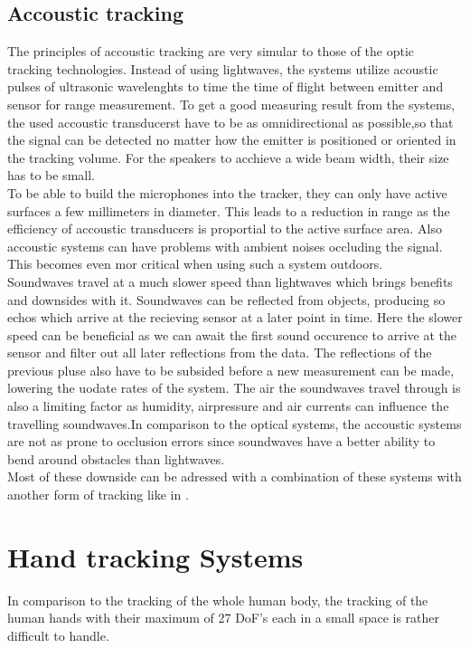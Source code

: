 \subsection{Accoustic tracking}
The principles of accoustic tracking are very simular to those of the optic tracking technologies. Instead of using lightwaves, the systems utilize acoustic pulses of ultrasonic wavelenghts to time the time of flight between emitter and sensor for range measurement. To get a good measuring result from the systems, the used accoustic transducerst have to be as omnidirectional as possible,so that the signal can be detected no matter how the emitter is positioned or oriented in the tracking volume. For the speakers to acchieve a wide beam width, their size has to be small.\\ To be able to build the microphones into the tracker, they can only have active surfaces a few millimeters in diameter. This leads to a reduction in range as the efficiency of accoustic transducers is proportial to the active surface area. Also accoustic systems can have problems with ambient noises occluding the signal. This becomes even mor critical when using such a system outdoors.\\Soundwaves travel at a much slower speed than lightwaves which brings benefits and downsides with it. Soundwaves can be reflected from objects, producing so echos which arrive at the recieving sensor at a later point in time. Here the slower speed can be beneficial as we can await the first sound occurence to arrive at the sensor and filter out all later reflections from the data. The reflections of the previous pluse also have to be subsided before a new measurement can be made, lowering the uodate rates of the system. The air the soundwaves travel through is also a limiting factor as humidity, airpressure and air currents can influence the travelling soundwaves.In comparison to the optical systems, the accoustic systems are not as prone to occlusion errors since soundwaves have a better ability to bend around obstacles  than lightwaves.
\\Most of these downside can be adressed with a combination of these systems with another form of tracking like in \cite{Foxlin.1998}.
\section{Hand tracking Systems}
In comparison to the tracking of the whole human body, the tracking of the human hands with their maximum of 27 DoF's each in a small space is rather difficult to handle. 
